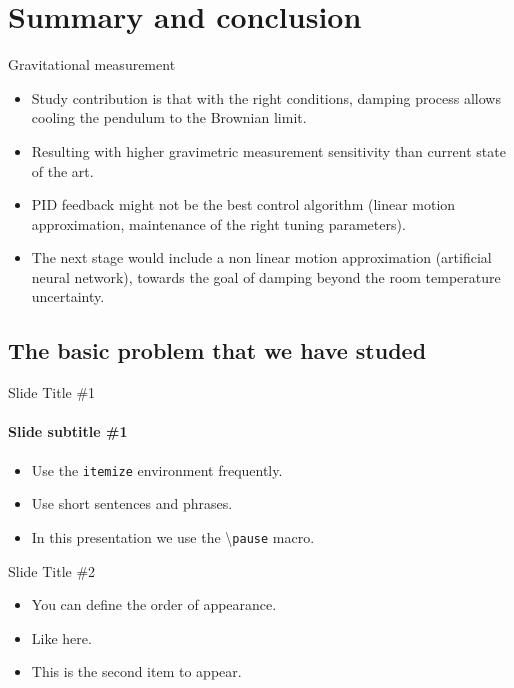 \documentclass{beamer}
\begin{document}
\section{Summary and conclusion}
\begin{frame}{Gravitational measurement}
	\begin{itemize}
		\framesubtitle{Study contribution}
		
		
		
		\item Study contribution is that with the right conditions, damping process allows cooling the pendulum to the Brownian limit. 
		\item Resulting with higher gravimetric measurement sensitivity than current state of the art.
		\pause
		\item PID feedback might not be the best control algorithm (linear motion approximation, maintenance of the right tuning parameters). 
		\item The next stage would include a non linear motion approximation (artificial neural network), towards the goal of damping beyond the room temperature uncertainty. 
	\end{itemize}
\end{frame}






\subsection[Basic Problem]{The basic problem that we have studed}

\begin{frame}{Slide Title \#1}
	\framesubtitle{Slide subtitle \#1}
	\begin{itemize}
		\item Use the \texttt{itemize} environment frequently.
		\pause
		\item Use short sentences and phrases.
		\pause
		\item In this presentation we use the \textbackslash{}\texttt{pause} macro.
	\end{itemize}
\end{frame}

\begin{frame}{Slide Title \#2}
	\begin{itemize}
		\item <1->You can define the order of appearance.
		\item <3->Like here.
		\item <2->This is the second item to appear.
	\end{itemize}
\end{frame}
\end{document}
